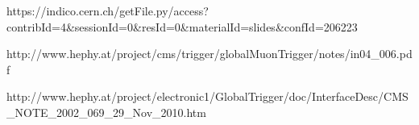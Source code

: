 \documentclass{cmspaper}
\begin{document}
\clearpage

\begin{thebibliography}{00}

 https://indico.cern.ch/getFile.py/access?contribId=4\&sessionId=0\&resId=0\&materialId=slides\&confId=206223

http://www.hephy.at/project/cms/trigger/globalMuonTrigger/notes/in04\_006.pdf

http://www.hephy.at/project/electronic1/GlobalTrigger/doc/InterfaceDesc/CMS\_NOTE\_2002\_069\_29\_Nov\_2010.htm


\end{thebibliography}
\end{document}
